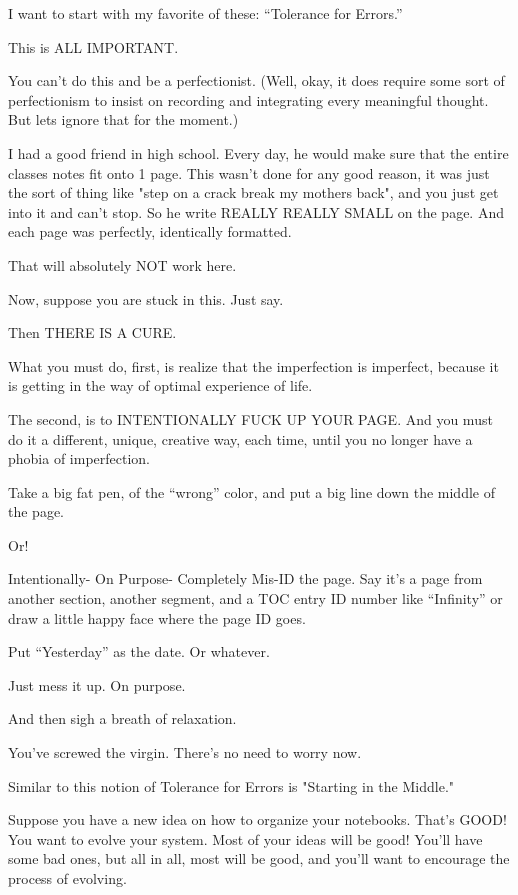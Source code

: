 \documentclass[oneside]{book}
\begin{document}
I want to start with my favorite of these: ``Tolerance for Errors.''

This is ALL IMPORTANT.

You can't do this and be a perfectionist. (Well, okay, it does require
some sort of perfectionism to insist on recording and integrating
every meaningful thought. But lets ignore that for the moment.)

I had a good friend in high school. Every day, he would make sure that
the entire classes notes fit onto 1 page. This wasn't done for any
good reason, it was just the sort of thing like "step on a crack break
my mothers back", and you just get into it and can't stop. So he write
REALLY REALLY SMALL on the page. And each page was perfectly,
identically formatted.

That will absolutely NOT work here.

Now, suppose you are stuck in this. Just say.

Then THERE IS A CURE.

What you must do, first, is realize that the imperfection is
imperfect, because it is getting in the way of optimal experience of
life.

The second, is to INTENTIONALLY FUCK UP YOUR PAGE. And you must do it
a different, unique, creative way, each time, until you no longer have
a phobia of imperfection.

Take a big fat pen, of the ``wrong'' color, and put a big line down the
middle of the page.

Or!

Intentionally- On Purpose- Completely Mis-ID the page. Say it's a page
from another section, another segment, and a TOC entry ID number like
``Infinity'' or draw a little happy face where the page ID goes.

Put ``Yesterday'' as the date. Or whatever.

Just mess it up. On purpose.

And then sigh a breath of relaxation.

You've screwed the virgin. There's no need to worry now.

Similar to this notion of Tolerance for Errors is "Starting in the
Middle."

Suppose you have a new idea on how to organize your notebooks. That's
GOOD! You want to evolve your system. Most of your ideas will be good!
You'll have some bad ones, but all in all, most will be good, and
you'll want to encourage the process of evolving.
\end{document}
